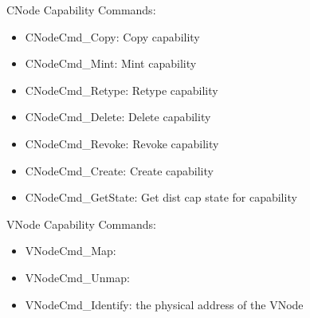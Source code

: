 \documentclass[a4paper,11pt,twoside]{report}
\begin{document}
{{CNode Capability Commands:
\begin{itemize}
\item CNodeCmd\_Copy: Copy capability
\item CNodeCmd\_Mint: Mint capability
\item CNodeCmd\_Retype: Retype capability
\item CNodeCmd\_Delete: Delete capability
\item CNodeCmd\_Revoke: Revoke capability
\item CNodeCmd\_Create: Create capability
\item CNodeCmd\_GetState: Get dist cap state for capability
\end{itemize}

VNode Capability Commands:
\begin{itemize}
\item VNodeCmd\_Map:
\item VNodeCmd\_Unmap:
\item VNodeCmd\_Identify: the physical address of the VNode
\end{itemize}

}}
\end{document}
